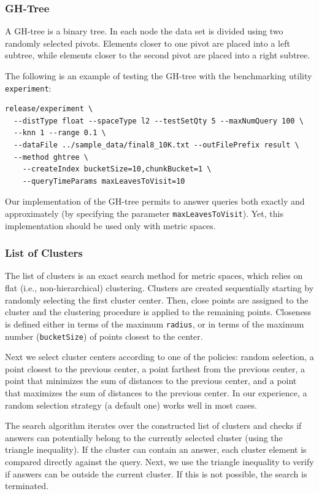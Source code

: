 \documentclass[runningheads,a4paper]{llncs}
\newcommand{\ttt}[1]{\texttt{#1}}
\begin{document}
{\subsubsection{GH-Tree}
A GH-tree \cite{Uhlmann:1991} is a binary tree. In each node the data set is divided using
two randomly selected pivots. Elements closer to one pivot are placed into a left
subtree, while elements closer to the second pivot are placed into a right subtree.

The following is an example of testing the GH-tree with the benchmarking utility \ttt{experiment}:
{
\footnotesize
\begin{verbatim}
release/experiment \
  --distType float --spaceType l2 --testSetQty 5 --maxNumQuery 100 \
  --knn 1 --range 0.1 \
  --dataFile ../sample_data/final8_10K.txt --outFilePrefix result \
  --method ghtree \
    --createIndex bucketSize=10,chunkBucket=1 \
    --queryTimeParams maxLeavesToVisit=10
\end{verbatim}
}

Our implementation of the GH-tree permits to answer queries both exactly and approximately (by specifying
the parameter \ttt{maxLeavesToVisit}). Yet, this implementation should be used only with metric spaces.

\subsubsection{List of Clusters}\label{SectionListClust}
The list of clusters \cite{chavez2005compact} is an exact search method for metric spaces,
which relies on flat (i.e., non-hierarchical) clustering.
Clusters are created sequentially starting by randomly selecting the first cluster center.
Then, close points are assigned to the cluster and the clustering procedure
is applied to the remaining points.
Closeness is defined either in terms of the maximum \ttt{radius},
or in terms of the maximum number (\ttt{bucketSize}) of points closest to the center.

Next we select cluster centers according to one of the policies:
random selection, a point closest to the previous center,
a point farthest from the previous center, a point that minimizes
the sum of distances to the previous center, and a point that maximizes  
the sum of distances to the previous center.
In our experience, a random selection strategy (a default one)
works well in most cases.

The search algorithm iterates over the constructed list of clusters and
checks if answers can potentially belong to the currently selected cluster
 (using the triangle inequality).
If the cluster can contain an answer,
each cluster element is compared directly against the query.
Next, we use the triangle inequality to verify if answers can
be outside the current cluster.
If this is not possible, the search is terminated.

}
\end{document}
